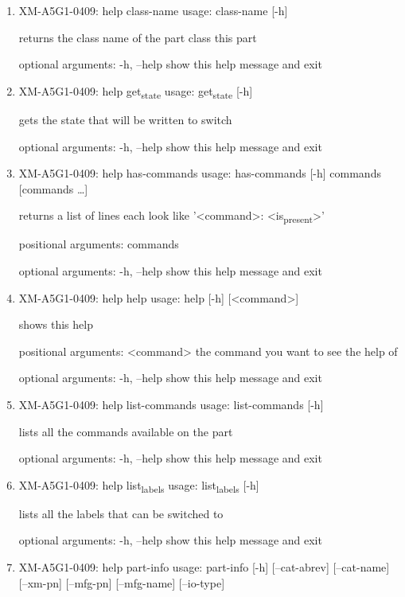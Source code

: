 \documentclass[11pt]{article}
\begin{document}
\begin{enumerate}
\item XM-A5G1-0409: help class-name
\label{sec:orgc006a28}
usage: class-name [-h]

returns the class name of the part class this part

optional arguments:
  -h, --help  show this help message and exit

\item XM-A5G1-0409: help get\textsubscript{state}
\label{sec:orgac91eca}
usage: get\textsubscript{state} [-h]

gets the state that will be written to switch

optional arguments:
  -h, --help  show this help message and exit

\item XM-A5G1-0409: help has-commands
\label{sec:org82c320c}
usage: has-commands [-h] commands [commands \ldots{}]

returns a list of lines each look like '<command>: <is\textsubscript{present}>'

positional arguments:
  commands

optional arguments:
  -h, --help  show this help message and exit

\item XM-A5G1-0409: help help
\label{sec:org719498d}
usage: help [-h] [<command>]

shows this help

positional arguments:
  <command>   the command you want to see the help of

optional arguments:
  -h, --help  show this help message and exit

\item XM-A5G1-0409: help list-commands
\label{sec:org2c792c6}
usage: list-commands [-h]

lists all the commands available on the part

optional arguments:
  -h, --help  show this help message and exit

\item XM-A5G1-0409: help list\textsubscript{labels}
\label{sec:org5bda205}
usage: list\textsubscript{labels} [-h]

lists all the labels that can be switched to

optional arguments:
  -h, --help  show this help message and exit

\item XM-A5G1-0409: help part-info
\label{sec:org30ed334}
usage: part-info  [-h] [--cat-abrev] [--cat-name] [--xm-pn] [--mfg-pn] [--mfg-name]
        [--io-type]


\end{enumerate}
\end{document}
